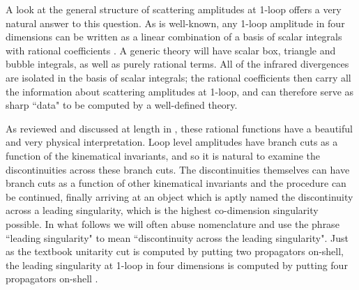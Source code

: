 \documentclass[12pt]{article}
\begin{document}
A look at the general structure of scattering amplitudes at 1-loop offers a very natural answer to this question.
As is well-known, any 1-loop amplitude in four dimensions can be written as a linear combination of a basis of scalar  integrals with rational coefficients \cite{basis}.  A generic theory will have scalar box, triangle and bubble integrals, as well as purely rational terms. All of the infrared divergences are isolated in the basis of scalar integrals; the rational coefficients then carry all the information about scattering amplitudes at 1-loop, and can therefore serve as sharp ``data" to be computed by a well-defined theory.

As reviewed and discussed at length in \cite{simplest}, these rational functions have a beautiful and very physical interpretation. Loop
level amplitudes have branch cuts as a function of the kinematical
invariants, and so it is natural to examine the discontinuities
across these branch cuts. The discontinuities themselves can have
branch cuts as a function of other kinematical invariants and
the procedure can be continued, finally arriving at an object which is aptly named the discontinuity
across a leading singularity, which is the highest co-dimension singularity possible. In what follows we will often abuse nomenclature and use the phrase ``leading singularity" to mean ``discontinuity across the leading singularity". Just as the textbook unitarity cut is computed by putting two propagators on-shell, the leading singularity at 1-loop in four dimensions is computed by putting four propagators on-shell \cite{lead}.
\end{document}
